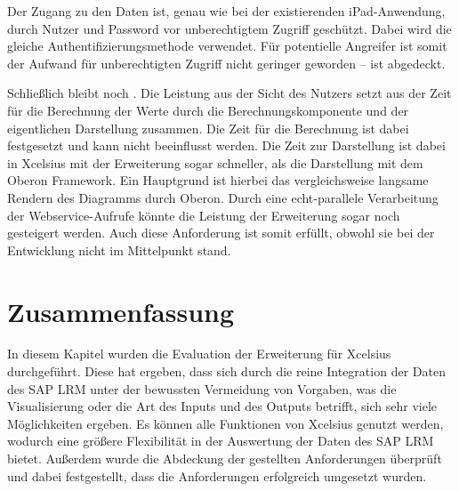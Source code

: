 \begin{onehalfspacing}
Der Zugang zu den Daten ist, genau wie bei der existierenden iPad-Anwendung, durch Nutzer und Password vor unberechtigtem Zugriff geschützt. Dabei wird die gleiche Authentifizierungsmethode verwendet. Für potentielle Angreifer ist somit der Aufwand für unberechtigten Zugriff nicht geringer geworden --  ist abgedeckt.

Schließlich bleibt noch . Die Leistung aus der Sicht des Nutzers setzt aus der Zeit für die Berechnung der Werte durch die Berechnungskomponente und der eigentlichen Darstellung zusammen. Die Zeit für die Berechnung ist dabei festgesetzt und kann nicht beeinflusst werden. Die Zeit zur Darstellung ist dabei in Xcelsius mit der Erweiterung sogar schneller, als die Darstellung mit dem Oberon Framework. Ein Hauptgrund ist hierbei das vergleichsweise langsame Rendern des Diagramms durch Oberon. Durch eine echt-parallele Verarbeitung der Webservice-Aufrufe könnte die Leistung der Erweiterung sogar noch gesteigert werden. Auch diese Anforderung ist somit erfüllt, obwohl sie bei der Entwicklung nicht im Mittelpunkt stand.

\section{Zusammenfassung}
In diesem Kapitel wurden die Evaluation der Erweiterung für Xcelsius durchgeführt. Diese hat ergeben, dass sich durch die reine Integration der Daten des SAP LRM unter der bewussten Vermeidung von Vorgaben, was die Visualisierung oder die Art des Inputs und des Outputs betrifft, sich sehr viele Möglichkeiten ergeben. Es können alle Funktionen von Xcelsius genutzt werden, wodurch eine größere Flexibilität in der Auswertung der Daten des SAP LRM bietet. Außerdem wurde die Abdeckung der gestellten Anforderungen überprüft und dabei festgestellt, dass die Anforderungen erfolgreich umgesetzt wurden.


\end{onehalfspacing}
